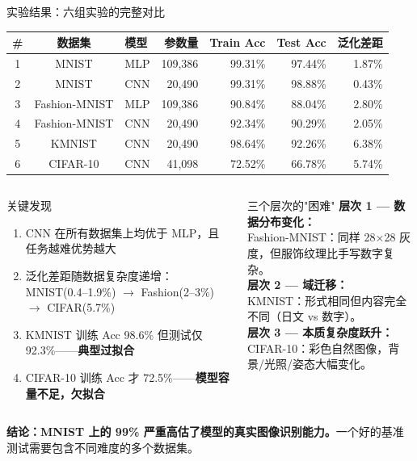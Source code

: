 \documentclass[aspectratio=169]{ctexbeamer}
\begin{document}
\begin{frame}[shrink=22]{实验结果：六组实验的完整对比}
\small

\begin{center}
\begin{tabular}{c c l r r r r}
\toprule
\textbf{\#} & \textbf{数据集} & \textbf{模型} & \textbf{参数量} & \textbf{Train Acc} & \textbf{Test Acc} & \textbf{泛化差距} \\
\midrule
1 & MNIST         & MLP & 109,386 & 99.31\% & 97.44\% & 1.87\% \\
2 & MNIST         & CNN & 20,490  & 99.31\% & 98.88\% & 0.43\% \\
3 & Fashion-MNIST & MLP & 109,386 & 90.84\% & 88.04\% & 2.80\% \\
4 & Fashion-MNIST & CNN & 20,490  & 92.34\% & 90.29\% & 2.05\% \\
5 & KMNIST        & CNN & 20,490  & 98.64\% & 92.26\% & \alert{6.38\%} \\
6 & CIFAR-10      & CNN & 41,098  & 72.52\% & 66.78\% & 5.74\% \\
\bottomrule
\end{tabular}
\end{center}

\vspace{0.15cm}

\begin{columns}[T]
\begin{block}{关键发现}
\footnotesize
\begin{enumerate}
  \item CNN 在所有数据集上均优于 MLP，且任务越难优势越大
  \item 泛化差距随数据复杂度递增：MNIST(0.4--1.9\%) $\to$ Fashion(2--3\%) $\to$ CIFAR(5.7\%)
  \item KMNIST 训练 Acc 98.6\% 但测试仅 92.3\%——\textbf{典型过拟合}
  \item CIFAR-10 训练 Acc 才 72.5\%——\textbf{模型容量不足，欠拟合}
\end{enumerate}
\end{block}

\begin{block}{三个层次的"困难"}
\footnotesize
\textbf{层次 1 — 数据分布变化：}\\
Fashion-MNIST：同样 28$\times$28 灰度，但服饰纹理比手写数字复杂。\\
\vspace{0.05cm}
\textbf{层次 2 — 域迁移：}\\
KMNIST：形式相同但内容完全不同（日文 vs 数字）。\\
\vspace{0.05cm}
\textbf{层次 3 — 本质复杂度跃升：}\\
CIFAR-10：彩色自然图像，背景/光照/姿态大幅变化。
\end{block}
\end{columns}

\vspace{0.1cm}
\footnotesize
\textbf{结论：MNIST 上的 99\% 严重高估了模型的真实图像识别能力。}一个好的基准测试需要包含不同难度的多个数据集。
\end{frame}
\end{document}
